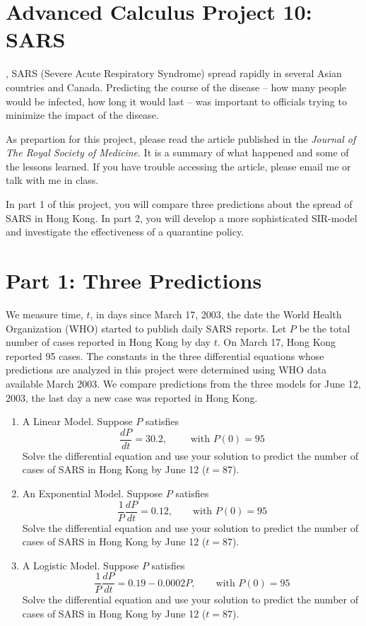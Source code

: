 \documentclass
[justified,nohyper]
{tufte-handout}
\begin{document}
\section{Advanced Calculus Project 10: SARS}

, SARS (Severe Acute Respiratory Syndrome) spread rapidly in several Asian countries and Canada. Predicting the course of the disease -- how many people would be infected, how long it would last -- was important to officials trying to minimize the impact of the disease.

As prepartion for this project, please read the article published in the \textit{Journal of The Royal Society of Medicine}. It is a summary of what happened and some of the lessons learned. If you have trouble accessing the article, please email me or talk with me in class.

In part 1 of this project, you will compare three predictions about the spread of SARS in Hong Kong. In part 2, you will develop a more sophisticated SIR-model and investigate the effectiveness of a quarantine policy.

\section{Part 1: Three Predictions}
We measure time, $t$, in days since March 17, 2003, the date the World Health Organization (WHO) started to publish daily SARS reports. Let $P$ be the total number of cases reported in Hong Kong by day $t$. On March 17, Hong Kong reported 95 cases. The constants in the three differential equations whose predictions are analyzed in this project were determined using WHO data available March 2003. We compare predictions from the three models for June 12, 2003, the last day a new case was reported in Hong Kong.

\begin{enumerate}
  \item A Linear Model. Suppose $P$ satisfies
  \[
      \dfrac{dP}{dt} = 30.2, \qquad \text{ with }  P(0)=95
  \]
  Solve the differential equation and use your solution to predict the number of cases of SARS in Hong Kong by June 12 ($t=87$).
  
  \item An Exponential Model. Suppose $P$ satisfies
  \[
      \dfrac{1}{P}\dfrac{dP}{dt} = 0.12, \qquad \text{with } P(0)=95
  \]
  Solve the differential equation and use your solution to predict the number of cases of SARS in Hong Kong by June 12 ($t=87$).
  
  \item A Logistic Model. Suppose $P$ satisfies
  \[
      \dfrac{1}{P}\dfrac{dP}{dt} = 0.19 - 0.0002P, \qquad \text{with } P(0)=95
  \]
  Solve the differential equation and use your solution to predict the number of cases of SARS in Hong Kong by June 12 ($t=87$).
\end{enumerate}
\end{document}
